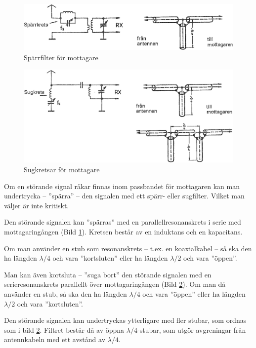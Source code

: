 \begin{figure}
  \includegraphics[width=\textwidth]{images/cropped_pdfs/bild_2_9-05.pdf}
  \caption{Spärrfilter för mottagare}
  \label{fig:bildII9-5}
\end{figure}

\begin{figure}
  \includegraphics[width=\textwidth]{images/cropped_pdfs/bild_2_9-06.pdf}
  \caption{Sugkretsar för mottagare}
  \label{fig:bildII9-6}
\end{figure}

Om en störande signal råkar finnas inom passbandet för mottagaren kan
man undertrycka -- ''spärra'' -- den signalen med ett spärr- eller
sugfilter. Vilket man väljer är inte kritiskt.

Den störande signalen kan ''spärras'' med en parallellresonanskrets i
serie med mottagaringången (Bild \ref{fig:bildII9-5}). Kretsen består av en
induktans och en kapacitans.

Om man använder en stub som resonanskrets -- t.ex. en koaxialkabel -- så
ska den ha längden \(\lambda/4\) och vara ''kortsluten'' eller ha
längden \(\lambda/2\) och vara ''öppen''.

Man kan även kortsluta -- ''suga bort'' den störande signalen med en
serieresonanskrets parallellt över mottagaringången (Bild \ref{fig:bildII9-6}). Om
man då använder en stub, så ska den ha längden \(\lambda/4\) och
vara ''öppen'' eller ha längden \(\lambda/2\) och vara ''kortsluten''.

Den störande signalen kan undertryckas ytterligare med fler stubar,
som ordnas som i bild \ref{fig:bildII9-6}. Filtret består då av öppna
\(\lambda/4\)-stubar, som utgör avgreningar från antennkabeln med ett
avstånd av \(\lambda/4\).

